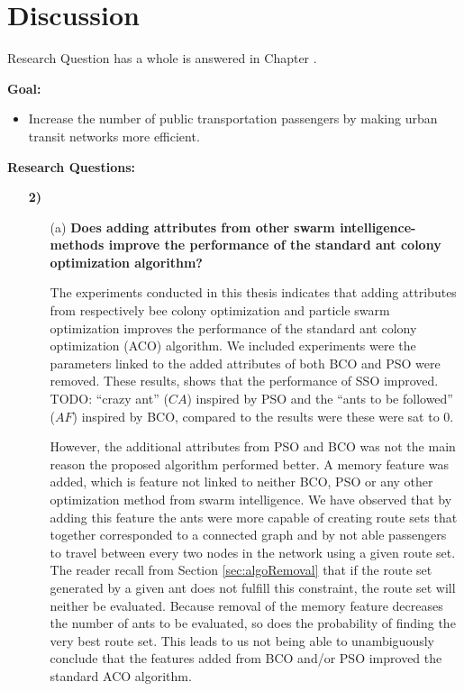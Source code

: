\section{Discussion}
Research Question \label{itm:1} has a whole is answered in Chapter \label{relatedWork}.

\textbf{Goal:}
\begin{itemize}
\item  Increase the number of public transportation passengers by making urban transit networks more efficient.
\end{itemize}

\textbf{Research Questions:}
\begin{enumerate}[label=\textbf{\arabic*})]
\item[\textbf{2)}]
    \begin{enumerate}

    \item[(a)]  \textbf{Does adding attributes from other swarm intelligence-methods improve the performance of the standard ant colony optimization algorithm?}

    The experiments conducted in this thesis indicates that adding attributes from respectively bee colony optimization and particle swarm optimization improves the performance of the standard ant colony optimization (ACO) algorithm. We included experiments were the parameters linked to the added attributes of both BCO and PSO were removed. These results, shows that the performance of SSO improved. TODO: ``crazy ant'' ($CA$) inspired by PSO and the ``ants to be followed'' ($AF$) inspired by BCO, compared to the results were these were sat to 0. 

    However, the additional attributes from PSO and BCO was not the main reason the proposed algorithm performed better. A memory feature was added, which is feature not linked to neither BCO, PSO or any other optimization method from swarm intelligence. We have observed that by adding this feature the ants were more capable of creating route sets that together corresponded to a connected graph and by not able passengers to travel between every two nodes in the network using a given route set. The reader recall from Section \vref{sec:algoRemoval} that if the route set generated by a given ant does not fulfill this constraint, the route set will neither be evaluated. Because removal of the memory feature decreases the number of ants to be evaluated, so does the probability of finding the very best route set. This leads to us not being able to unambiguously conclude that the features added from BCO and/or PSO improved the standard ACO algorithm.


\end{enumerate}
\end{enumerate}

